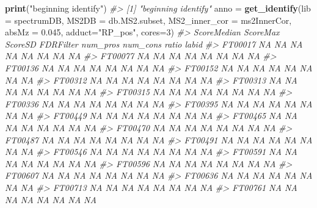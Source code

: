 \documentclass[
]{article}
\newenvironment{Shaded}{\begin{snugshade}}{\end{snugshade}}
\newcommand{\CommentTok}[1]{\textcolor[rgb]{0.56,0.35,0.01}{\textit{#1}}}
\newcommand{\DataTypeTok}[1]{\textcolor[rgb]{0.13,0.29,0.53}{#1}}
\newcommand{\DecValTok}[1]{\textcolor[rgb]{0.00,0.00,0.81}{#1}}
\newcommand{\FloatTok}[1]{\textcolor[rgb]{0.00,0.00,0.81}{#1}}
\newcommand{\KeywordTok}[1]{\textcolor[rgb]{0.13,0.29,0.53}{\textbf{#1}}}
\newcommand{\NormalTok}[1]{#1}
\newcommand{\StringTok}[1]{\textcolor[rgb]{0.31,0.60,0.02}{#1}}
\begin{document}
\begin{Shaded}
\begin{Highlighting}[]
\KeywordTok{print}\NormalTok{(}\StringTok{"beginning identify"}\NormalTok{)}
\CommentTok{#> [1] "beginning identify"}
\NormalTok{anno =}\StringTok{ }\KeywordTok{get_identify}\NormalTok{(}\DataTypeTok{lib =}\NormalTok{ spectrumDB, }\DataTypeTok{MS2DB =}\NormalTok{ db.MS2.subset, }\DataTypeTok{MS2_inner_cor =}\NormalTok{ ms2InnerCor, }\DataTypeTok{absMz =} \FloatTok{0.045}\NormalTok{, }\DataTypeTok{adduct=}\StringTok{"RP_pos"}\NormalTok{, }\DataTypeTok{cores=}\DecValTok{3}\NormalTok{)}
\CommentTok{#>         ScoreMedian ScoreMax ScoreSD FDRFilter num_pros num_cons ratio labid}
\CommentTok{#> FT00017          NA       NA      NA        NA       NA       NA    NA    NA}
\CommentTok{#> FT00077          NA       NA      NA        NA       NA       NA    NA    NA}
\CommentTok{#> FT00136          NA       NA      NA        NA       NA       NA    NA    NA}
\CommentTok{#> FT00152          NA       NA      NA        NA       NA       NA    NA    NA}
\CommentTok{#> FT00312          NA       NA      NA        NA       NA       NA    NA    NA}
\CommentTok{#> FT00313          NA       NA      NA        NA       NA       NA    NA    NA}
\CommentTok{#> FT00315          NA       NA      NA        NA       NA       NA    NA    NA}
\CommentTok{#> FT00336          NA       NA      NA        NA       NA       NA    NA    NA}
\CommentTok{#> FT00395          NA       NA      NA        NA       NA       NA    NA    NA}
\CommentTok{#> FT00449          NA       NA      NA        NA       NA       NA    NA    NA}
\CommentTok{#> FT00465          NA       NA      NA        NA       NA       NA    NA    NA}
\CommentTok{#> FT00470          NA       NA      NA        NA       NA       NA    NA    NA}
\CommentTok{#> FT00487          NA       NA      NA        NA       NA       NA    NA    NA}
\CommentTok{#> FT00491          NA       NA      NA        NA       NA       NA    NA    NA}
\CommentTok{#> FT00546          NA       NA      NA        NA       NA       NA    NA    NA}
\CommentTok{#> FT00591          NA       NA      NA        NA       NA       NA    NA    NA}
\CommentTok{#> FT00596          NA       NA      NA        NA       NA       NA    NA    NA}
\CommentTok{#> FT00607          NA       NA      NA        NA       NA       NA    NA    NA}
\CommentTok{#> FT00636          NA       NA      NA        NA       NA       NA    NA    NA}
\CommentTok{#> FT00713          NA       NA      NA        NA       NA       NA    NA    NA}
\CommentTok{#> FT00761          NA       NA      NA        NA       NA       NA    NA    NA}

\end{Highlighting}
\end{Shaded}
\end{document}
